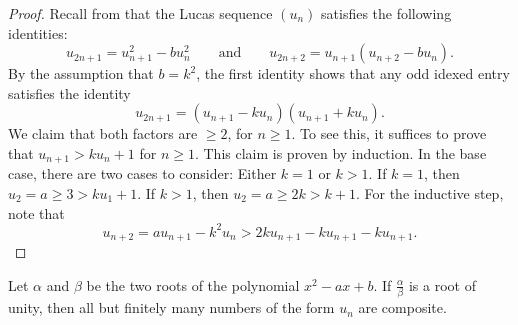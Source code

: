 \begin{proof}
  Recall from  that the Lucas sequence $(u_n)$ satisfies the following identities:
  \begin{equation*}
    u_{2n+1}=u_{n+1}^2-bu_n^2\qquad\text{and}\qquad u_{2n+2}=u_{n+1}(u_{n+2}-bu_n).
  \end{equation*}
  By the assumption that $b=k^2$, the first identity shows that any odd idexed entry satisfies the identity
  \begin{equation*}
    u_{2n+1}=(u_{n+1}-ku_n)(u_{n+1}+ku_n).
  \end{equation*}
  We claim that both factors are $\geq 2$, for $n\geq 1$. To see this, it suffices to prove that $u_{n+1}>ku_n+1$ for $n\geq 1$. This claim is proven by induction. In the base case, there are two cases to consider: Either $k=1$ or $k>1$. If $k=1$, then $u_2=a\geq 3>ku_1+1$. If $k>1$, then $u_2=a\geq 2k>k+1$. For the inductive step, note that
  \begin{equation*}
    u_{n+2}=au_{n+1}-k^2u_n>2ku_{n+1}-ku_{n+1}-ku_{n+1}.
  \end{equation*}
\end{proof}

\begin{theorem}
  Let $\alpha$ and $\beta$ be the two roots of the polynomial $x^2-ax+b$. If $\frac{\alpha}{\beta}$ is a root of unity, then all but finitely many numbers of the form $u_n$ are composite.
\end{theorem}


